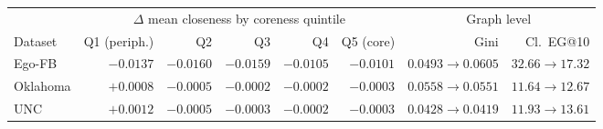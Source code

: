 \begin{tabular}{lrrrrrrr}
\toprule
 & \multicolumn{5}{c}{$\Delta$ mean closeness by coreness quintile} & \multicolumn{2}{c}{Graph level} \\
\cmidrule(lr){2-6}\cmidrule(lr){7-8}
Dataset & Q1 (periph.) & Q2 & Q3 & Q4 & Q5 (core) & Gini & Cl.\ EG@10 \\
\midrule
Ego-FB & $-0.0137$ & $-0.0160$ & $-0.0159$ & $-0.0105$ & $-0.0101$ & $0.0493 \to 0.0605$ & $32.66 \to 17.32$ \\
Oklahoma & $+0.0008$ & $-0.0005$ & $-0.0002$ & $-0.0002$ & $-0.0003$ & $0.0558 \to 0.0551$ & $11.64 \to 12.67$ \\
UNC & $+0.0012$ & $-0.0005$ & $-0.0003$ & $-0.0002$ & $-0.0003$ & $0.0428 \to 0.0419$ & $11.93 \to 13.61$ \\
\bottomrule
\end{tabular}

